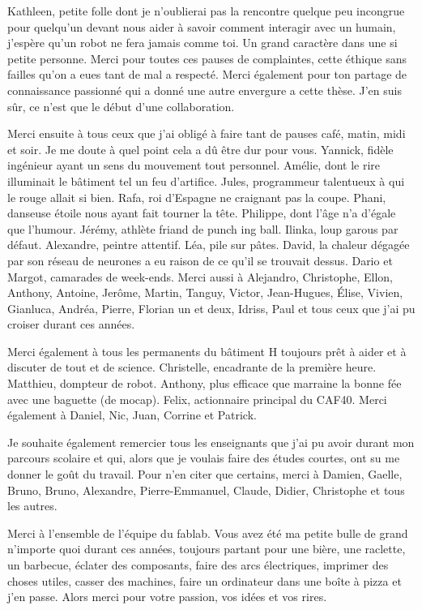 \documentclass[english,a4paper,11pt,twoside]{StyleThese}
\begin{document}
Kathleen, petite folle dont je n'oublierai pas la rencontre quelque peu incongrue pour quelqu'un devant nous aider à savoir comment interagir avec un humain, j'espère qu'un robot ne fera jamais comme toi. Un grand caractère dans une si petite personne. Merci pour toutes ces pauses de complaintes, cette éthique sans failles qu'on a eues tant de mal a respecté. Merci également pour ton partage de connaissance passionné qui a donné une autre envergure a cette thèse. J'en suis sûr, ce n'est que le début d'une collaboration.

Merci ensuite à tous ceux que j'ai obligé à faire tant de pauses café, matin, midi et soir. Je me doute à quel point cela a dû être dur pour vous. Yannick, fidèle ingénieur ayant un sens du mouvement tout personnel. Amélie, dont le rire illuminait le bâtiment tel un feu d'artifice. Jules, programmeur talentueux à qui le rouge allait si bien. Rafa, roi d'Espagne ne craignant pas la coupe. Phani, danseuse étoile nous ayant fait tourner la tête. Philippe, dont l'âge n'a d'égale que l'humour. Jérémy, athlète friand de punch ing ball. Ilinka, loup garous par défaut. Alexandre, peintre attentif. Léa, pile sur pâtes. David, la chaleur dégagée par son réseau de neurones a eu raison de ce qu'il se trouvait dessus. Dario et Margot, camarades de week-ends. Merci aussi à Alejandro, Christophe, Ellon, Anthony, Antoine, Jerôme, Martin, Tanguy, Victor, Jean-Hugues, Élise, Vivien, Gianluca, Andréa, Pierre, Florian un et deux, Idriss, Paul et tous ceux que j'ai pu croiser durant ces années.

Merci également à tous les permanents du bâtiment H toujours prêt à aider et à discuter de tout et de science. Christelle, encadrante de la première heure. Matthieu, dompteur de robot. Anthony, plus efficace que marraine la bonne fée avec une baguette (de mocap). Felix, actionnaire principal du CAF40. Merci également à Daniel, Nic, Juan, Corrine et Patrick.

Je souhaite également remercier tous les enseignants que j'ai pu avoir durant mon parcours scolaire et qui, alors que je voulais faire des études courtes, ont su me donner le goût du travail. Pour n'en citer que certains, merci à Damien, Gaelle, Bruno, Bruno, Alexandre, Pierre-Emmanuel, Claude, Didier, Christophe et tous les autres.

Merci à l'ensemble de l'équipe du fablab. Vous avez été ma petite bulle de grand n'importe quoi durant ces années, toujours partant pour une bière, une raclette, un barbecue, éclater des composants, faire des arcs électriques, imprimer des choses utiles, casser des machines, faire un ordinateur dans une boîte à pizza et j'en passe. Alors merci pour votre passion, vos idées et vos rires.
\end{document}
